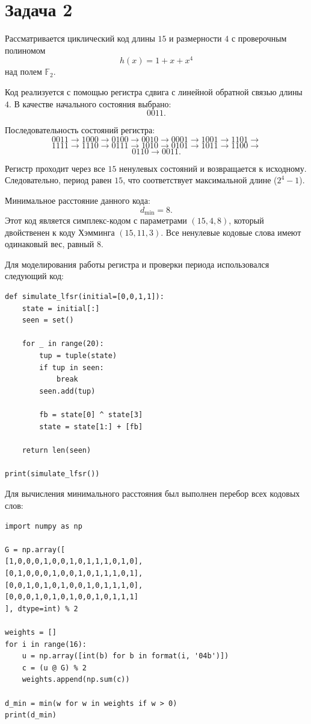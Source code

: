 \documentclass[a4paper,12pt]{article}
\begin{document}
\section*{Задача 2}

Рассматривается циклический код длины $15$ и размерности $4$ с проверочным полиномом
\[
h(x) = 1 + x + x^4
\]
над полем $\mathbb{F}_2$.

Код реализуется с помощью регистра сдвига с линейной обратной связью длины $4$. В качестве начального состояния выбрано:
\[
0011.
\]

Последовательность состояний регистра:
\[
0011 \to 1000 \to 0100 \to 0010 \to 0001 \to 1001 \to 1101 \to
\]
\[
1111 \to 1110 \to 0111 \to 1010 \to 0101 \to 1011 \to 1100 \to
\]
\[
0110 \to 0011.
\]

Регистр проходит через все $15$ ненулевых состояний и возвращается к исходному. Следовательно, период равен $15$, что соответствует максимальной длине ($2^4 - 1$).

Минимальное расстояние данного кода:
\[
d_{\min} = 8.
\]
Этот код является симплекс-кодом с параметрами $(15,4,8)$, который двойственен к коду Хэмминга $(15,11,3)$. Все ненулевые кодовые слова имеют одинаковый вес, равный $8$.

Для моделирования работы регистра и проверки периода использовался следующий код:

\begin{verbatim}
def simulate_lfsr(initial=[0,0,1,1]):
    state = initial[:]
    seen = set()

    for _ in range(20):
        tup = tuple(state)
        if tup in seen:
            break
        seen.add(tup)

        fb = state[0] ^ state[3]
        state = state[1:] + [fb]

    return len(seen)

print(simulate_lfsr())
\end{verbatim}

Для вычисления минимального расстояния был выполнен перебор всех кодовых слов:

\begin{verbatim}
import numpy as np

G = np.array([
[1,0,0,0,1,0,0,1,0,1,1,1,0,1,0],
[0,1,0,0,0,1,0,0,1,0,1,1,1,0,1],
[0,0,1,0,1,0,1,0,0,1,0,1,1,1,0],
[0,0,0,1,0,1,0,1,0,0,1,0,1,1,1]
], dtype=int) % 2

weights = []
for i in range(16):
    u = np.array([int(b) for b in format(i, '04b')])
    c = (u @ G) % 2
    weights.append(np.sum(c))

d_min = min(w for w in weights if w > 0)
print(d_min)
\end{verbatim}
\end{document}
